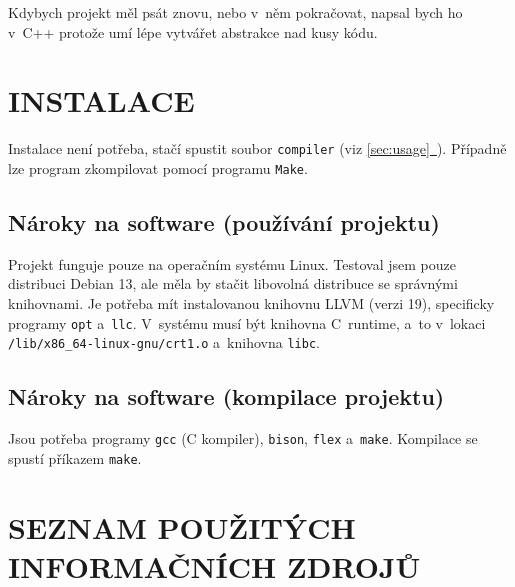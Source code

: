\documentclass[12pt]{article}
\newcommand{\fullref}[1]{\hyperref[#1]{\ref*{#1}\ \nameref*{#1}}}
\def\showtodo{\immediate\write16{}}
\def\file#1{\texttt{#1}}
\def\code#1{\texttt{#1}}
\begin{document}
Kdybych projekt měl psát znovu, nebo v~něm pokračovat, napsal bych ho v~C++ protože umí lépe vytvářet abstrakce nad kusy kódu.


\section{INSTALACE}
Instalace není potřeba, stačí spustit soubor \file{compiler} (viz \fullref{sec:usage}).
Případně lze program zkompilovat pomocí programu \code{Make}.

\subsection{Nároky na software (používání projektu)}
Projekt funguje pouze na operačním systému Linux.
Testoval jsem pouze distribuci Debian 13, ale měla by stačit libovolná distribuce se správnými knihovnami.
Je potřeba mít instalovanou knihovnu LLVM (verzi 19), specificky programy \file{opt} a~\file{llc}.
V~systému musí být knihovna C~runtime, a~to v~lokaci \file{/lib/x86\_64-linux-gnu/crt1.o} a~knihovna \file{libc}.

\subsection{Nároky na software (kompilace projektu)}
Jsou potřeba programy \code{gcc} (C kompiler), \code{bison}, \code{flex} a~\code{make}.
Kompilace se spustí příkazem \code{make}.


\section{SEZNAM POUŽITÝCH INFORMAČNÍCH ZDROJŮ}
\printbibliography

\showtodo
\end{document}
